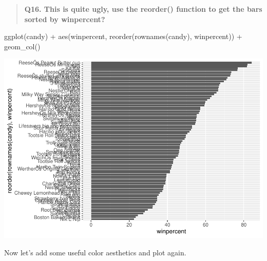 \documentclass[
]{article}
\newenvironment{Shaded}{\begin{snugshade}}{\end{snugshade}}
\newcommand{\AttributeTok}[1]{\textcolor[rgb]{0.77,0.63,0.00}{#1}}
\newcommand{\FunctionTok}[1]{\textcolor[rgb]{0.00,0.00,0.00}{#1}}
\newcommand{\NormalTok}[1]{#1}
\newcommand{\OtherTok}[1]{\textcolor[rgb]{0.56,0.35,0.01}{#1}}
\newcommand{\SpecialCharTok}[1]{\textcolor[rgb]{0.00,0.00,0.00}{#1}}
\newcommand{\StringTok}[1]{\textcolor[rgb]{0.31,0.60,0.02}{#1}}
\begin{document}
\begin{quote}
\textbf{Q16. This is quite ugly, use the reorder() function to get the
bars sorted by winpercent?}
\end{quote}

\begin{Shaded}
\begin{Highlighting}[]
\FunctionTok{ggplot}\NormalTok{(candy) }\SpecialCharTok{+} 
  \FunctionTok{aes}\NormalTok{(winpercent, }\FunctionTok{reorder}\NormalTok{(}\FunctionTok{rownames}\NormalTok{(candy), winpercent)) }\SpecialCharTok{+}
  \FunctionTok{geom\_col}\NormalTok{()}
\end{Highlighting}
\end{Shaded}

\includegraphics{Class-10-Halloween-Candy_files/figure-latex/unnamed-chunk-16-1.pdf}

Now let's add some useful color aesthetics and plot again.

\begin{Shaded}
\end{Shaded}
\end{document}
